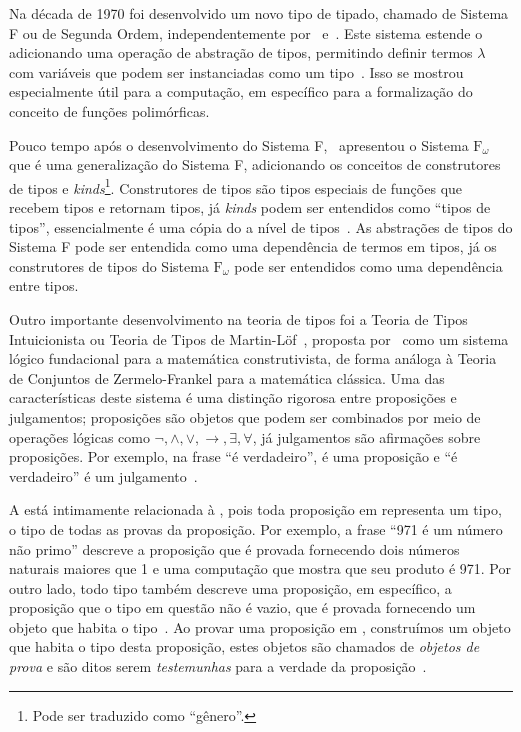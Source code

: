 		Na década de 1970 foi desenvolvido um novo tipo de \CalcLambda tipado, chamado de Sistema F ou \CalcLambda de Segunda Ordem, independentemente por~
		e~. Este sistema estende o \CLST adicionando uma operação de abstração de tipos, permitindo definir termos \(\lambda\)
		com variáveis que podem ser instanciadas como um tipo~\cite{girard1989proofs}. Isso se mostrou especialmente útil para a computação, em específico
		para a formalização do conceito de funções polimórficas.

		Pouco tempo após o desenvolvimento do Sistema F,~ apresentou o Sistema \(\mathrm{F}_\omega\)~\cite{girard1972interpretation}
		que é uma generalização do Sistema F, adicionando os conceitos de construtores de tipos e \textit{kinds}\footnote{Pode ser traduzido como ``gênero''.}.
		Construtores de tipos são tipos especiais de funções que recebem tipos e retornam tipos, já \textit{kinds} podem ser entendidos como ``tipos de tipos'',
		essencialmente é uma cópia do \CLST a nível de tipos~\cite{pierce2002types}. As abstrações de tipos do Sistema F pode ser entendida
		como uma dependência de termos em tipos, já os construtores de tipos do Sistema \(\mathrm{F}_\omega\) pode ser entendidos como uma dependência
		entre tipos.

		Outro importante desenvolvimento na teoria de tipos foi a Teoria de Tipos Intuicionista ou Teoria de Tipos de Martin-Löf~\cite{martin1975intuitionistic,martin1984intuitionistic},
		proposta por~ como um sistema lógico fundacional para a matemática construtivista, de forma análoga à
		Teoria de Conjuntos de Zermelo-Frankel para a matemática clássica. Uma das características deste sistema é uma distinção rigorosa entre proposições
		e julgamentos; proposições são objetos que podem ser combinados por meio de operações lógicas como \(\neg, \land, \lor, \to, \exists, \forall\), já
		julgamentos são afirmações sobre proposições. Por exemplo, na frase ``\PHI é verdadeiro'', \PHI é uma proposição e ``\PHI é verdadeiro'' é um
		julgamento~\cite{martin1984intuitionistic}.

		A \TTML está intimamente relacionada à \CCH, pois toda proposição em \TTML representa um tipo, o tipo de todas as provas da proposição. Por exemplo,
		a frase ``971 é um número não primo'' descreve a proposição que é provada fornecendo dois números naturais maiores que 1 e uma computação que mostra
		que seu produto é 971. Por outro lado, todo tipo também descreve uma proposição, em específico, a proposição que o tipo em questão não é vazio, que
		é provada fornecendo um objeto que habita o tipo~\cite{martin1975intuitionistic}. Ao provar uma proposição em \TTML, construímos um objeto que habita o tipo
		desta proposição, estes objetos são chamados de \textit{objetos de prova} e são ditos serem \textit{testemunhas} para a verdade da proposição~\cite{sep-type-theory-intuitionistic}.

